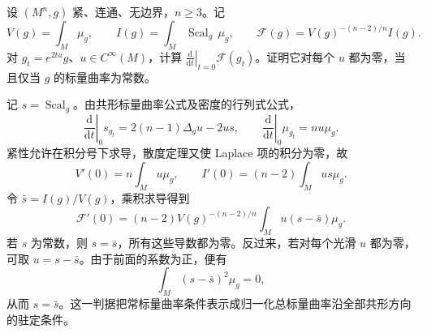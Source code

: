 \begin{exercise}\label{g3:ex:normalized-total-scalar-variation}
	设 \((M^n,g)\) 紧、连通、无边界，\(n\ge3\)。记
	\[
		V(g)=\int_M\mu_g,\qquad
		I(g)=\int_M\operatorname{Scal}_g\,\mu_g,\qquad
		\mathcal F(g)=V(g)^{-(n-2)/n}I(g).
	\]
	对 \(g_t=e^{2tu}g\)、\(u\in C^\infty(M)\)，计算 \(\left.\frac{\mathrm d}{\mathrm dt}\right|_{t=0}\mathcal F(g_t)\)。证明它对每个 \(u\) 都为零，当且仅当 \(g\) 的标量曲率为常数。
\end{exercise}
\begin{solution}
	记 \(s=\operatorname{Scal}_g\)。由共形标量曲率公式及密度的行列式公式，
	\[
		\left.\frac{\mathrm d}{\mathrm dt}\right|_0s_{g_t}
		=2(n-1)\Delta_gu-2us,\qquad
		\left.\frac{\mathrm d}{\mathrm dt}\right|_0\mu_{g_t}=nu\mu_g.
	\]
	紧性允许在积分号下求导，散度定理又使 Laplace 项的积分为零，故
	\[
		V'(0)=n\int_Mu\mu_g,\qquad
		I'(0)=(n-2)\int_Mus\mu_g.
	\]
	令 \(\bar s=I(g)/V(g)\)，乘积求导得到
	\[
		\mathcal F'(0)
		=(n-2)V(g)^{-(n-2)/n}
		\int_Mu(s-\bar s)\mu_g.
	\]
	若 \(s\) 为常数，则 \(s=\bar s\)，所有这些导数都为零。反过来，若对每个光滑 \(u\) 都为零，可取 \(u=s-\bar s\)。由于前面的系数为正，便有
	\[
		\int_M(s-\bar s)^2\mu_g=0,
	\]
	从而 \(s=\bar s\)。这一判据把常标量曲率条件表示成归一化总标量曲率沿全部共形方向的驻定条件。
\end{solution}

